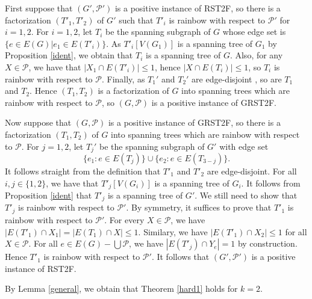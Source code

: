 \documentclass{article}
\begin{document}
First suppose that $(G',\mathcal{P}')$ is a positive instance of RST2F, so there is a factorization $(T'_1,T'_2)$ of $G'$ such that $T'_i$ is rainbow with respect to $\mathcal{P}'$ for $i=1,2$. For $i=1,2$, let $T_i$ be the spanning subgraph of $G$ whose edge set is $\{e \in E(G)|e_1 \in E(T'_i)\}$. As $T'_i[V(G_1)]$ is a spanning tree of $G_1$ by Proposition \ref{ident}, we obtain that $T_i$ is a spanning tree of $G$. Also, for any $X \in \mathcal{P}$, we have that $|X_1 \cap E(T'_i)|\leq 1$, hence $|X \cap E(T_i)|\leq 1$, so $T_i$ is rainbow with respect to $\mathcal{P}$. Finally, as $T_1'$ and $T_2'$ are edge-disjoint , so are $T_1$ and $T_2$. Hence $(T_1,T_2)$ is a factorization of $G$ into spanning trees which are rainbow with respect to $\mathcal{P}$, so $(G,\mathcal{P})$ is a positive instance of GRST2F.

Now suppose that $(G,\mathcal{P})$ is a positive instance of GRST2F, so there is a factorization $(T_1,T_2)$ of $G$ into spanning trees which are rainbow with respect to $\mathcal{P}$. %
 For $j=1,2$, let $T_j'$ be the spanning subgraph of $G'$ with edge set $$\{e_1:e \in E(T_j)\}\cup \{e_2: e \in E(T_{3-j})\}.$$
 It follows straight from the definition that $T'_1$ and $T'_{2}$ are edge-disjoint. For all $i,j \in \{1,2\}$, we have that $T'_j[V(G_i)]$ is a spanning tree of $G_i$. It follows from Proposition \ref{ident} that $T'_j$ is a spanning tree of $G'$. We still need to show that $T'_j$ is rainbow with respect to $\mathcal{P}'$. By symmetry, it suffices to prove that $T'_1$ is rainbow with respect to $\mathcal{P}'$. For every $X \in \mathcal{P}$, we have $|E(T'_1)\cap X_1|=|E(T_1)\cap X|\leq 1$. Similary, we have $|E(T'_1)\cap X_2| \leq 1$ for all $X \in \mathcal{P}$. For all $e \in E(G)-\bigcup \mathcal{P}$, we have $|E(T'_j)\cap Y_e|=1$ by construction. Hence $T'_1$ is rainbow with respect to $\mathcal{P}'$. It follows that $(G',\mathcal{P}')$ is a positive instance of RST2F.

By Lemma \ref{general}, we obtain that Theorem \ref{hard1} holds for $k=2$.
\end{document}
